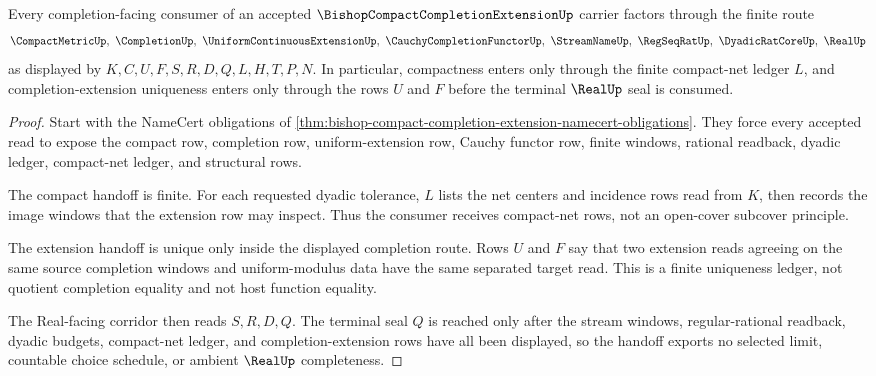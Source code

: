 \begin{theorem}
\label{thm:bishop-compact-completion-extension-finite-net-handoff}
Every completion-facing consumer of an accepted
$\BishopCompactCompletionExtensionUp$ carrier factors through the finite route
$$
\CompactMetricUp,\ \CompletionUp,\ \UniformContinuousExtensionUp,\ 
\CauchyCompletionFunctorUp,\ \StreamNameUp,\ \RegSeqRatUp,\ 
\DyadicRatCoreUp,\ \RealUp
$$
as displayed by $K,C,U,F,S,R,D,Q,L,H,T,P,N$. In particular, compactness enters
only through the finite compact-net ledger $L$, and completion-extension
uniqueness enters only through the rows $U$ and $F$ before the terminal
$\RealUp$ seal is consumed.
\end{theorem}
\begin{proof}
Start with the NameCert obligations of
\autoref{thm:bishop-compact-completion-extension-namecert-obligations}. They
force every accepted read to expose the compact row, completion row,
uniform-extension row, Cauchy functor row, finite windows, rational readback,
dyadic ledger, compact-net ledger, and structural rows.

The compact handoff is finite. For each requested dyadic tolerance, $L$ lists
the net centers and incidence rows read from $K$, then records the image
windows that the extension row may inspect. Thus the consumer receives
compact-net rows, not an open-cover subcover principle.

The extension handoff is unique only inside the displayed completion route.
Rows $U$ and $F$ say that two extension reads agreeing on the same source
completion windows and uniform-modulus data have the same separated target
read. This is a finite uniqueness ledger, not quotient completion equality and
not host function equality.

The Real-facing corridor then reads $S,R,D,Q$. The terminal seal $Q$ is reached
only after the stream windows, regular-rational readback, dyadic budgets,
compact-net ledger, and completion-extension rows have all been displayed, so
the handoff exports no selected limit, countable choice schedule, or ambient
$\RealUp$ completeness.
\end{proof}


